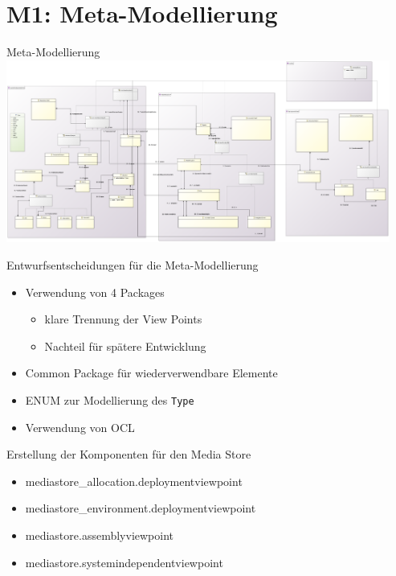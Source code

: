 \section[M1: Metamodell]{M1: Meta-Modellierung}
\begin{frame}{Meta-Modellierung}
	\centering
	\includegraphics[height=60mm]{figures/meta-modell.png}
\end{frame}

\begin{frame}{Entwurfsentscheidungen für die Meta-Modellierung}
	\begin{itemize}
		\item Verwendung von 4 Packages
		\begin{itemize}
			\item klare Trennung der View Points
			\item Nachteil für spätere Entwicklung
		\end{itemize}
		
		\item Common Package für wiederverwendbare Elemente
		\item ENUM zur Modellierung des \texttt{Type}
		\item Verwendung von OCL
	\end{itemize}
\end{frame}

\begin{frame}{Erstellung der Komponenten für den Media Store}
	\begin{itemize}
		\item mediastore\_allocation.deploymentviewpoint
		\item mediastore\_environment.deploymentviewpoint
		\item mediastore.assemblyviewpoint
		\item mediastore.systemindependentviewpoint
	\end{itemize}
\end{frame}